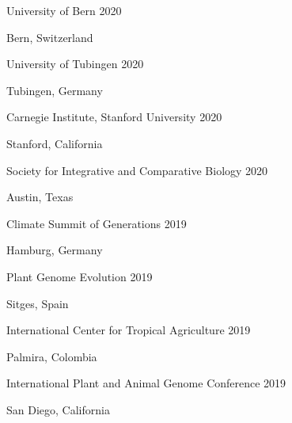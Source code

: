 \documentclass[12pt,english]{article}
\begin{document}
\hspace*{1.0em}University of Bern \hfill 2020 \par
\hspace*{2.0em}Bern, Switzerland \par\vspace{0.5ex}

\hspace*{1.0em}University of Tubingen \hfill 2020 \par
\hspace*{2.0em}Tubingen, Germany \par\vspace{0.5ex}

\hspace*{1.0em}Carnegie Institute, Stanford University \hfill 2020 \par
\hspace*{2.0em}Stanford, California \par\vspace{0.5ex}

\hspace*{1.0em}Society for Integrative and Comparative Biology \hfill 2020 \par
\hspace*{2.0em}Austin, Texas \par\vspace{0.5ex}

\hspace*{1.0em}Climate Summit of Generations \hfill 2019 \par
\hspace*{2.0em}Hamburg, Germany \par\vspace{0.5ex}

\hspace*{1.0em}Plant Genome Evolution \hfill 2019 \par
\hspace*{2.0em}Sitges, Spain \par\vspace{0.5ex}

\hspace*{1.0em}International Center for Tropical Agriculture  \hfill 2019 \par
\hspace*{2.0em}Palmira, Colombia \par\vspace{0.5ex}

\hspace*{1.0em}International Plant and Animal Genome Conference  \hfill 2019 \par
\hspace*{2.0em}San Diego, California \par\vspace{0.5ex}
\end{document}
